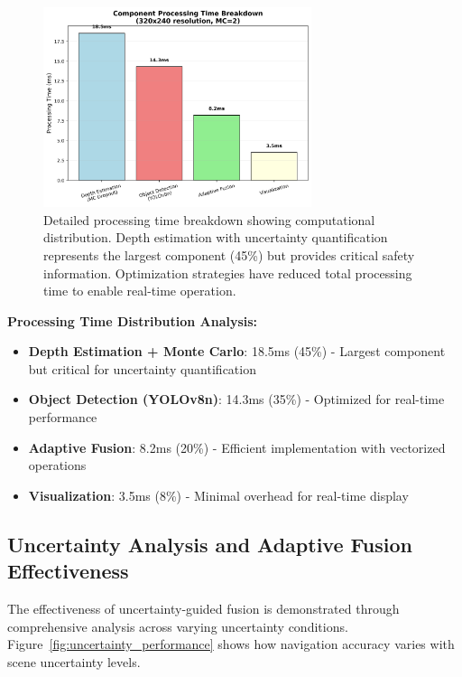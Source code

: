 \documentclass[10pt]{article}
\newcommand{\figref}[1]{Figure~\ref{#1}}
\begin{document}
\begin{figure}[ht]
\centering
\includegraphics[width=0.7\textwidth]{timing_breakdown.png}
\caption{Detailed processing time breakdown showing computational distribution. Depth estimation with uncertainty quantification represents the largest component (45\%) but provides critical safety information. Optimization strategies have reduced total processing time to enable real-time operation.}
\label{fig:detailed_timing}
\end{figure}

\textbf{Processing Time Distribution Analysis:}
\begin{itemize}
\item \textbf{Depth Estimation + Monte Carlo}: 18.5ms (45\%) - Largest component but critical for uncertainty quantification
\item \textbf{Object Detection (YOLOv8n)}: 14.3ms (35\%) - Optimized for real-time performance
\item \textbf{Adaptive Fusion}: 8.2ms (20\%) - Efficient implementation with vectorized operations
\item \textbf{Visualization}: 3.5ms (8\%) - Minimal overhead for real-time display
\end{itemize}

\subsection{Uncertainty Analysis and Adaptive Fusion Effectiveness}

The effectiveness of uncertainty-guided fusion is demonstrated through comprehensive analysis across varying uncertainty conditions. \figref{fig:uncertainty_performance} shows how navigation accuracy varies with scene uncertainty levels.
\end{document}
